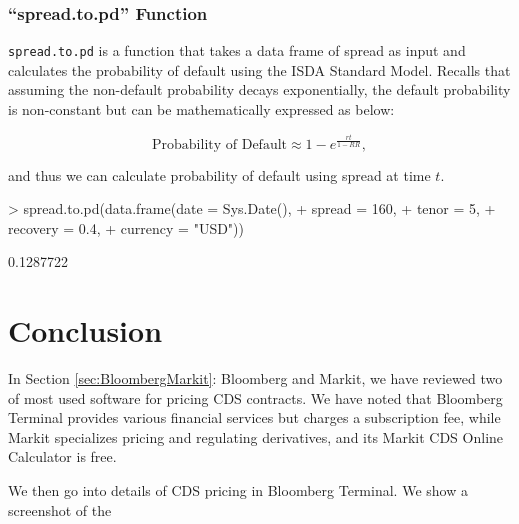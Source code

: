\documentclass{jss}
\begin{document}
\subsubsection{``spread.to.pd'' Function}

\texttt{spread.to.pd} is a function that takes a data frame of spread as input and calculates the probability of default using the ISDA Standard Model. Recalls that assuming the non-default probability decays exponentially, the default probability is non-constant but can be mathematically expressed as below:
 
\begin{equation}
  \text{Probability of Default} \approx 1 - e ^ {\frac{rt}{1-RR}}, \nonumber
\end{equation}

and thus we can calculate probability of default using spread at time $t$.

\begin{Schunk}
\begin{Sinput}
> spread.to.pd(data.frame(date     = Sys.Date(),
+                         spread   = 160,
+                         tenor    = 5,
+                         recovery = 0.4,
+                         currency = "USD"))
\end{Sinput}
\begin{Soutput}
[1] 0.1287722
\end{Soutput}
\end{Schunk}

\section{Conclusion}


In Section \ref{sec:BloombergMarkit}: Bloomberg and Markit, we have reviewed two of most used software for pricing CDS contracts. We have noted that Bloomberg Terminal provides various financial services but charges a subscription fee, while Markit specializes pricing and regulating derivatives, and its Markit CDS Online Calculator is free. 

We then go into details of CDS pricing in Bloomberg Terminal. We show a screenshot of the 

\newpage

\cite{barclays}
\cite{bloomberg}
\cite{openGamma}
\cite{glossary}
\cite{cdsOrigins}
\cite{blythe}
\cite{jk}
\cite{rates}
\cite{kane:david}
\cite{creditDerivatives}
\end{document}
